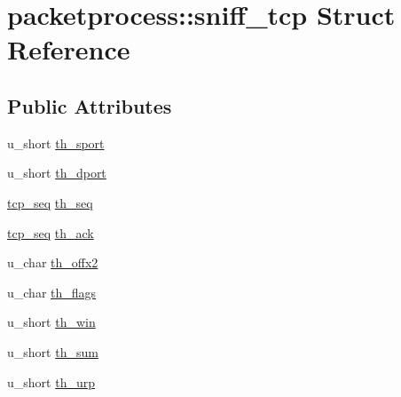 \hypertarget{structpacketprocess_1_1sniff__tcp}{\section{packetprocess\-:\-:sniff\-\_\-tcp Struct Reference}
\label{structpacketprocess_1_1sniff__tcp}
}
\subsection*{Public Attributes}
\begin{DoxyCompactItemize}
\item 
u\-\_\-short \hyperlink{structpacketprocess_1_1sniff__tcp_ab814641263dc3626b73e8e7c57b49a00}{th\-\_\-sport}
\item 
u\-\_\-short \hyperlink{structpacketprocess_1_1sniff__tcp_afbe56b14857648c5103efa9d2a0ec779}{th\-\_\-dport}
\item 
\hyperlink{namespacepacketprocess_a18e81a7f74513cbc9f8881ee72f67abe}{tcp\-\_\-seq} \hyperlink{structpacketprocess_1_1sniff__tcp_aa01277954ec955054dd5d1c3b03f2839}{th\-\_\-seq}
\item 
\hyperlink{namespacepacketprocess_a18e81a7f74513cbc9f8881ee72f67abe}{tcp\-\_\-seq} \hyperlink{structpacketprocess_1_1sniff__tcp_ad4d7498b971dce6b6f5d50c6e291be92}{th\-\_\-ack}
\item 
u\-\_\-char \hyperlink{structpacketprocess_1_1sniff__tcp_aa4abd6a8fe26942e9568f7746fc6ac7c}{th\-\_\-offx2}
\item 
u\-\_\-char \hyperlink{structpacketprocess_1_1sniff__tcp_a0f4f0920d36ddb965b2fcf747e566be5}{th\-\_\-flags}
\item 
u\-\_\-short \hyperlink{structpacketprocess_1_1sniff__tcp_ab968a17a027d8c57b3c9235cd820adc5}{th\-\_\-win}
\item 
u\-\_\-short \hyperlink{structpacketprocess_1_1sniff__tcp_a8cf363fe4f55a8327ae61ed1eec128f6}{th\-\_\-sum}
\item 
u\-\_\-short \hyperlink{structpacketprocess_1_1sniff__tcp_ae7950e9fd8826097186f481337406cf8}{th\-\_\-urp}
\end{DoxyCompactItemize}


